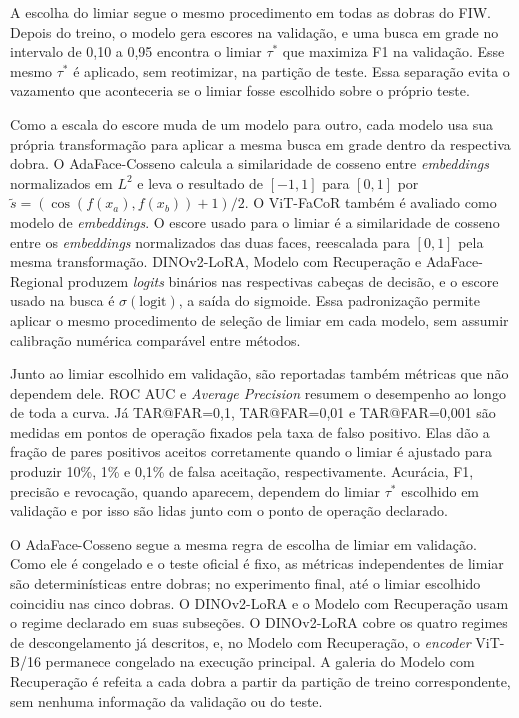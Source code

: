 A escolha do limiar segue o mesmo procedimento em todas as dobras do FIW. Depois do treino, o modelo gera escores na validação, e uma busca em grade no intervalo de 0,10 a 0,95 encontra o limiar $\tau^*$ que maximiza F1 na validação. Esse mesmo $\tau^*$ é aplicado, sem reotimizar, na partição de teste. Essa separação evita o vazamento que aconteceria se o limiar fosse escolhido sobre o próprio teste.

Como a escala do escore muda de um modelo para outro, cada modelo usa sua própria transformação para aplicar a mesma busca em grade dentro da respectiva dobra. O AdaFace-Cosseno calcula a similaridade de cosseno entre \textit{embeddings} normalizados em $L^2$ e leva o resultado de $[-1, 1]$ para $[0, 1]$ por $\tilde{s} = (\cos(f(x_a), f(x_b)) + 1)/2$. O ViT-FaCoR também é avaliado como modelo de \textit{embeddings}. O escore usado para o limiar é a similaridade de cosseno entre os \textit{embeddings} normalizados das duas faces, reescalada para $[0, 1]$ pela mesma transformação. DINOv2-LoRA, Modelo com Recuperação e AdaFace-Regional produzem \textit{logits} binários nas respectivas cabeças de decisão, e o escore usado na busca é $\sigma(\text{logit})$, a saída do sigmoide. Essa padronização permite aplicar o mesmo procedimento de seleção de limiar em cada modelo, sem assumir calibração numérica comparável entre métodos.

Junto ao limiar escolhido em validação, são reportadas também métricas que não dependem dele. ROC AUC e \textit{Average Precision} resumem o desempenho ao longo de toda a curva. Já TAR@FAR=0,1, TAR@FAR=0,01 e TAR@FAR=0,001 são medidas em pontos de operação fixados pela taxa de falso positivo. Elas dão a fração de pares positivos aceitos corretamente quando o limiar é ajustado para produzir 10\%, 1\% e 0,1\% de falsa aceitação, respectivamente. Acurácia, F1, precisão e revocação, quando aparecem, dependem do limiar $\tau^*$ escolhido em validação e por isso são lidas junto com o ponto de operação declarado.

O AdaFace-Cosseno segue a mesma regra de escolha de limiar em validação. Como ele é congelado e o teste oficial é fixo, as métricas independentes de limiar são determinísticas entre dobras; no experimento final, até o limiar escolhido coincidiu nas cinco dobras. O DINOv2-LoRA e o Modelo com Recuperação usam o regime declarado em suas subseções. O DINOv2-LoRA cobre os quatro regimes de descongelamento já descritos, e, no Modelo com Recuperação, o \textit{encoder} ViT-B/16 permanece congelado na execução principal. A galeria do Modelo com Recuperação é refeita a cada dobra a partir da partição de treino correspondente, sem nenhuma informação da validação ou do teste.

